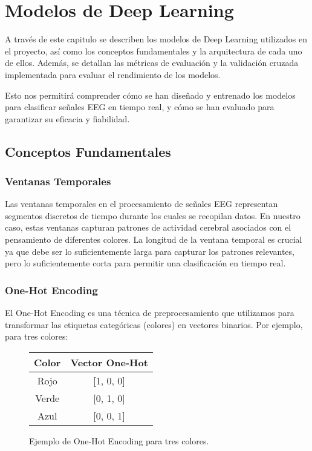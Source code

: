 \chapter{Modelos de Deep Learning}\label{ch:deep_learning_models}

A través de este capitulo se describen los modelos de Deep Learning \cite{raschka2022machine} utilizados en el proyecto, así como los conceptos fundamentales y la arquitectura de cada uno de ellos. Además, se detallan las métricas de evaluación y la validación cruzada implementada para evaluar el rendimiento de los modelos.

Esto nos permitirá comprender cómo se han diseñado y entrenado los modelos para clasificar señales EEG en tiempo real, y cómo se han evaluado para garantizar su eficacia y fiabilidad.

\section{Conceptos Fundamentales}

\subsection{Ventanas Temporales}
Las ventanas temporales en el procesamiento de señales EEG representan segmentos discretos de tiempo durante los cuales se recopilan datos. En nuestro caso, estas ventanas capturan patrones de actividad cerebral asociados con el pensamiento de diferentes colores. La longitud de la ventana temporal es crucial ya que debe ser lo suficientemente larga para capturar los patrones relevantes, pero lo suficientemente corta para permitir una clasificación en tiempo real.

\subsection{One-Hot Encoding}
El One-Hot Encoding \cite{raschka2022machine} es una técnica de preprocesamiento que utilizamos para transformar las etiquetas categóricas (colores) en vectores binarios. Por ejemplo, para tres colores:

\begin{figure}[h!]
    \centering
    \begin{tabular}{c|c}
        Color & Vector One-Hot \\
        \hline
        Rojo & [1, 0, 0] \\
        Verde & [0, 1, 0] \\
        Azul & [0, 0, 1]
    \end{tabular}
    \caption{Ejemplo de One-Hot Encoding para tres colores.}
    \label{fig:one_hot_encoding}
\end{figure}

